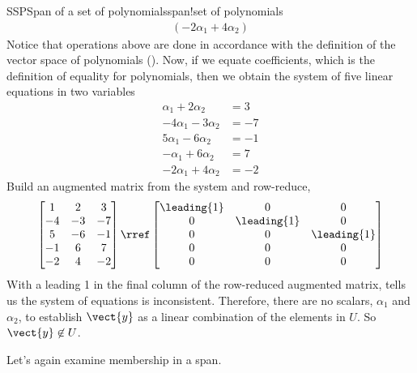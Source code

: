 \begin{example}{SSP}{Span of a set of polynomials}{span!set of polynomials}
\begin{align*}
(-2\alpha_1+4\alpha_2)
\end{align*}
%
Notice that operations above are done in accordance with the definition of the vector space of polynomials ().  Now, if we equate coefficients, which is the definition of equality for polynomials, then we obtain the system of five linear equations in two variables
%
\begin{align*}
\alpha_1+2\alpha_2&=3\\
-4\alpha_1-3\alpha_2&=-7\\
5\alpha_1-6\alpha_2&=-1\\
-\alpha_1+6\alpha_2&=7\\
-2\alpha_1+4\alpha_2&=-2
\end{align*}
%
Build an augmented matrix from the system and row-reduce,
%
\begin{equation*}
%
\begin{bmatrix}
1 & 2 & 3\\
-4 & -3 & -7\\
5 & -6 & -1\\
-1 & 6 & 7\\
-2 & 4 & -2
\end{bmatrix}
%
\rref
%
\begin{bmatrix}
\leading{1} & 0 & 0\\
0 & \leading{1} & 0\\
0 & 0 & \leading{1}\\
0 & 0 & 0\\
0 & 0 & 0
\end{bmatrix}
\end{equation*}
%
With a leading 1 in the final column of the row-reduced augmented matrix,  tells us the system of equations is inconsistent.  Therefore, there are no scalars, $\alpha_1$ and $\alpha_2$, to establish $\vect{y}$ as a linear combination of the elements in $U$.  So  $\vect{y}\not\in U$.
%
\end{example}
%
Let's again examine membership in a span.
%
